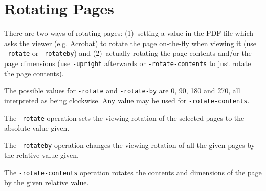\documentclass{book}
\begin{document}
\noindent{}

  \section{Rotating Pages}

There are two ways of rotating pages: (1)~setting a value in the PDF file which
asks the viewer (e.g. Acrobat) to rotate the page on-the-fly when viewing it
(use \texttt{-rotate} or \texttt{-rotateby}) and (2)~actually rotating the page
contents and/or the page dimensions (use \texttt{-upright} afterwards or
\texttt{-rotate-contents} to just rotate the page contents).

  The possible values for \texttt{-rotate} and \texttt{-rotate-by} are 0, 90,
180 and 270, all interpreted as being clockwise. Any value may be used for
\texttt{-rotate-contents}.
  
The \texttt{-rotate} operation sets the viewing rotation of the selected pages to
the absolute value given.

\noindent{}
  \noindent The \texttt{-rotateby} operation changes the viewing rotation of all the
given pages by the relative value given.

\noindent{}
  \noindent The \texttt{-rotate-contents} operation rotates the contents and dimensions
of the page by the given relative value.


\noindent{}
\end{document}
